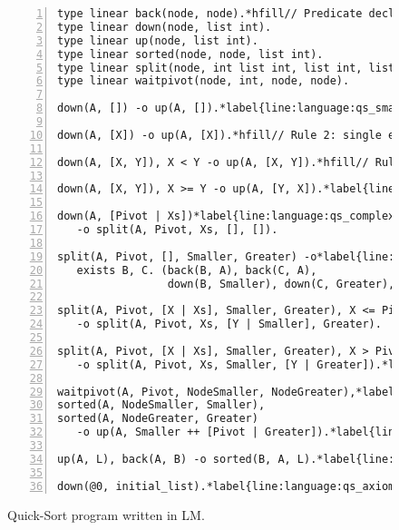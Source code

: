 \begin{figure}[h!]
\begin{Verbatim}[numbers=left,fontsize=\codesize,commandchars=\*\{\}]
type linear back(node, node).*hfill// Predicate declaration.
type linear down(node, list int).
type linear up(node, list int).
type linear sorted(node, node, list int).
type linear split(node, int list int, list int, list int).
type linear waitpivot(node, int, node, node).

down(A, []) -o up(A, []).*label{line:language:qs_small1}*hfill// Rule 1: empty list.

down(A, [X]) -o up(A, [X]).*hfill// Rule 2: single element list.

down(A, [X, Y]), X < Y -o up(A, [X, Y]).*hfill// Rule 3: two element list.

down(A, [X, Y]), X >= Y -o up(A, [Y, X]).*label{line:language:qs_small2}*hfill// Rule 4: two element list.

down(A, [Pivot | Xs])*label{line:language:qs_complex}*hfill// Rule 5: lists with more than two elements.
   -o split(A, Pivot, Xs, [], []).

split(A, Pivot, [], Smaller, Greater) -o*label{line:language:qs_exists1}*hfill// Rule 6: create nodes to sort sublists.
   exists B, C. (back(B, A), back(C, A),
                 down(B, Smaller), down(C, Greater), waitpivot(A, Pivot, B, C)).*label{line:language:qs_exists2}

split(A, Pivot, [X | Xs], Smaller, Greater), X <= Pivot*label{line:language:qs_split1}*hfill// Rule 7: split case 1.
   -o split(A, Pivot, Xs, [Y | Smaller], Greater).

split(A, Pivot, [X | Xs], Smaller, Greater), X > Pivot*hfill// Rule 8: split case 2.
   -o split(A, Pivot, Xs, Smaller, [Y | Greater]).*label{line:language:qs_split2}
   
waitpivot(A, Pivot, NodeSmaller, NodeGreater),*label{line:language:qs_sorted1}*hfill// Rule 9: merge sublists.
sorted(A, NodeSmaller, Smaller),
sorted(A, NodeGreater, Greater)
   -o up(A, Smaller ++ [Pivot | Greater]).*label{line:language:qs_sorted2}*label{line:language:qs_up} // Append the lists.

up(A, L), back(A, B) -o sorted(B, A, L).*label{line:language:qs_back}*hfill// Rule 10: send list to parent.

down(@0, initial_list).*label{line:language:qs_axiom}*hfill// Initial facts.
\end{Verbatim}
  \caption{Quick-Sort program written in LM.}
  \label{language:code:quicksort}
\end{figure}

